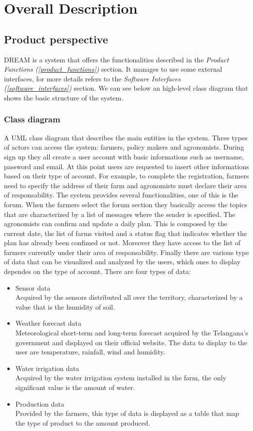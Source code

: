 \documentclass[table, 12pt]{article}
\begin{document}
\section{Overall Description}
\subsection{Product perspective}
DREAM is a system that offers the functionalities described in the \textit{Product Functions (\ref{product_functions})} section.
It manages to use some external interfaces, for more details refers to the \textit{Software Interfaces (\ref{software_interfaces})} section.
We can see below an high-level class diagram that shows the basic structure of the system.
\subsubsection{Class diagram}
A UML class diagram that describes the main entities in the system.
Three types of actors can access the system: farmers, policy makers and agronomists.
During sign up they all create a user account with basic informations such as username, password and email.
At this point users are requested to insert other informations based on their type of account.
For example, to complete the registration, farmers need to specify the address of their farm and agronomists must declare their area of responsability.
The system provides several functionalities, one of this is the forum.
When the farmers select the forum section they basically access the topics that are characterized by a list of messages where the sender is specified. 
The agronomists can confirm and update a daily plan.
This is composed by the current date, the list of farms visited and a status flag that indicates whether the plan has already been confimed or not.
Moreover they have access to the list of farmers currently under their area of responsability.
Finally there are various type of data that can be visualized and analyzed by the users, which ones to display dependes on the type of account.
There are four types of data:
\begin{itemize}
    \item Sensor data\\
    Acquired by the sensors distributed all over the territory, characterized by a value that is the humidity of soil.
    \item Weather forecast data\\
    Meteorological short-term and long-term forecast acquired by the Telangana's government and displayed on their official website.
    The data to display to the user are temperature, rainfall, wind and humidity.
    \item Water irrigation data\\
    Acquired by the water irrigation system installed in the farm, the only significant value is the amount of water.
    \item Production data\\
    Provided by the farmers, this type of data is displayed as a table that map the type of product to the amount produced.
\end{itemize}
\end{document}
